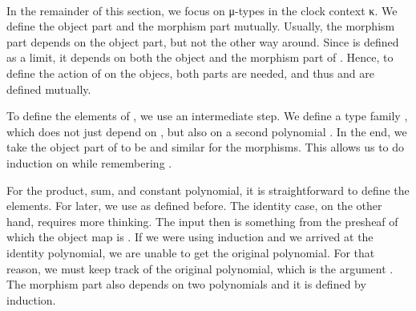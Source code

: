 {\begin{code}
\AgdaSpace{}%
\AgdaSymbol{(}\AgdaSpace{}%
\AgdaSpace{}%
\AgdaSymbol{)}\<%
\\
%
\>[2]\AgdaSpace{}%
\AgdaSymbol{:}\AgdaSpace{}%
\AgdaSymbol{\{}\AgdaSpace{}%
\AgdaSpace{}%
\AgdaSymbol{:}\AgdaSpace{}%
\AgdaSpace{}%
\AgdaSymbol{\}}\AgdaSpace{}%
\AgdaSpace{}%
\AgdaSpace{}%
\AgdaSpace{}%
\AgdaSpace{}%
\AgdaSpace{}%
\AgdaSpace{}%
\AgdaSpace{}%
\AgdaSymbol{(}\AgdaSpace{}%
\AgdaSpace{}%
\AgdaSymbol{)}\<%
\end{code}
}


In the remainder of this section, we focus on μ-types in the clock context κ.
We define the object part and the morphism part mutually.
Usually, the morphism part depends on the object part, but not the other way around.
Since   is defined as a limit, it depends on both the object and the morphism part of .
Hence, to define the action of  on the objecs, both parts are needed, and thus  and  are defined mutually.

To define the elements of  , we use an intermediate step.
We define a type family , which does not just depend on , but also on a second polynomial .
In the end, we take the object part of   to be    and similar for the morphisms.
This allows us to do induction on  while remembering .

For the product, sum, and constant polynomial, it is straightforward to define the elements.
For later, we use  as defined before.
The identity case, on the other hand, requires more thinking.
The input then is something from the presheaf   of which the object map is   .
If we were using induction and we arrived at the identity polynomial, we are unable to get the original polynomial.
For that reason, we must keep track of the original polynomial, which is the argument .
The morphism part  also depends on two polynomials and it is defined by induction.

